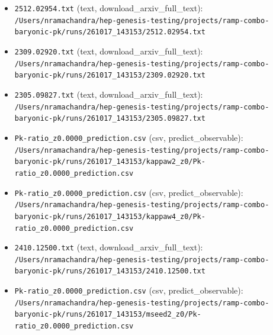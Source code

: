 \documentclass[11pt,a4paper]{article}
\begin{document}
\begin{itemize}
  \item \texttt{2512.02954.txt} (text, download\_arxiv\_full\_text): \texttt{/\allowbreak{}Users/\allowbreak{}nramachandra/\allowbreak{}hep-genesis-testing/\allowbreak{}projects/\allowbreak{}ramp-combo-baryonic-pk/\allowbreak{}runs/\allowbreak{}261017\_\allowbreak{}143153/\allowbreak{}2512.02954.txt}
  \item \texttt{2309.02920.txt} (text, download\_arxiv\_full\_text): \texttt{/\allowbreak{}Users/\allowbreak{}nramachandra/\allowbreak{}hep-genesis-testing/\allowbreak{}projects/\allowbreak{}ramp-combo-baryonic-pk/\allowbreak{}runs/\allowbreak{}261017\_\allowbreak{}143153/\allowbreak{}2309.02920.txt}
  \item \texttt{2305.09827.txt} (text, download\_arxiv\_full\_text): \texttt{/\allowbreak{}Users/\allowbreak{}nramachandra/\allowbreak{}hep-genesis-testing/\allowbreak{}projects/\allowbreak{}ramp-combo-baryonic-pk/\allowbreak{}runs/\allowbreak{}261017\_\allowbreak{}143153/\allowbreak{}2305.09827.txt}
  \item \texttt{Pk-ratio\_\allowbreak{}z0.0000\_\allowbreak{}prediction.csv} (csv, predict\_observable): \texttt{/\allowbreak{}Users/\allowbreak{}nramachandra/\allowbreak{}hep-genesis-testing/\allowbreak{}projects/\allowbreak{}ramp-combo-baryonic-pk/\allowbreak{}runs/\allowbreak{}261017\_\allowbreak{}143153/\allowbreak{}kappaw2\_\allowbreak{}z0/\allowbreak{}Pk-ratio\_\allowbreak{}z0.0000\_\allowbreak{}prediction.csv}
  \item \texttt{Pk-ratio\_\allowbreak{}z0.0000\_\allowbreak{}prediction.csv} (csv, predict\_observable): \texttt{/\allowbreak{}Users/\allowbreak{}nramachandra/\allowbreak{}hep-genesis-testing/\allowbreak{}projects/\allowbreak{}ramp-combo-baryonic-pk/\allowbreak{}runs/\allowbreak{}261017\_\allowbreak{}143153/\allowbreak{}kappaw4\_\allowbreak{}z0/\allowbreak{}Pk-ratio\_\allowbreak{}z0.0000\_\allowbreak{}prediction.csv}
  \item \texttt{2410.12500.txt} (text, download\_arxiv\_full\_text): \texttt{/\allowbreak{}Users/\allowbreak{}nramachandra/\allowbreak{}hep-genesis-testing/\allowbreak{}projects/\allowbreak{}ramp-combo-baryonic-pk/\allowbreak{}runs/\allowbreak{}261017\_\allowbreak{}143153/\allowbreak{}2410.12500.txt}
  \item \texttt{Pk-ratio\_\allowbreak{}z0.0000\_\allowbreak{}prediction.csv} (csv, predict\_observable): \texttt{/\allowbreak{}Users/\allowbreak{}nramachandra/\allowbreak{}hep-genesis-testing/\allowbreak{}projects/\allowbreak{}ramp-combo-baryonic-pk/\allowbreak{}runs/\allowbreak{}261017\_\allowbreak{}143153/\allowbreak{}mseed2\_\allowbreak{}z0/\allowbreak{}Pk-ratio\_\allowbreak{}z0.0000\_\allowbreak{}prediction.csv}

\end{itemize}
\end{document}
